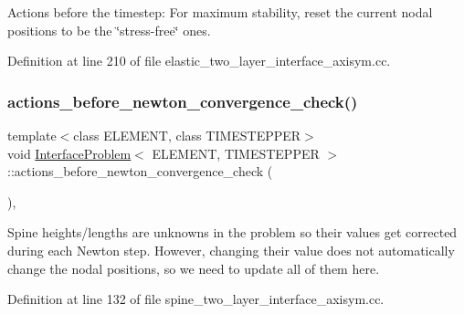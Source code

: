 Actions before the timestep\+: For maximum stability, reset the current nodal positions to be the \char`\"{}stress-\/free\char`\"{} ones. 



Definition at line 210 of file elastic\+\_\+two\+\_\+layer\+\_\+interface\+\_\+axisym.\+cc.

\mbox{\label{classInterfaceProblem_ab4193771472aefce4cd67261491cc344}} 
\subsubsection{\texorpdfstring{actions\+\_\+before\+\_\+newton\+\_\+convergence\+\_\+check()}{actions\_before\_newton\_convergence\_check()}}
{\footnotesize\ttfamily template$<$class E\+L\+E\+M\+E\+NT, class T\+I\+M\+E\+S\+T\+E\+P\+P\+ER$>$ \\
void \hyperlink{classInterfaceProblem}{Interface\+Problem}$<$ E\+L\+E\+M\+E\+NT, T\+I\+M\+E\+S\+T\+E\+P\+P\+ER $>$\+::actions\+\_\+before\+\_\+newton\+\_\+convergence\+\_\+check (\begin{DoxyParamCaption}{ }\end{DoxyParamCaption})\hspace{0.3cm}{\ttfamily [inline]}, {\ttfamily [private]}}



Spine heights/lengths are unknowns in the problem so their values get corrected during each Newton step. However, changing their value does not automatically change the nodal positions, so we need to update all of them here. 



Definition at line 132 of file spine\+\_\+two\+\_\+layer\+\_\+interface\+\_\+axisym.\+cc.

\mbox{\label{classInterfaceProblem_ade63c8a74f666edf530460b989968b4f}} 
